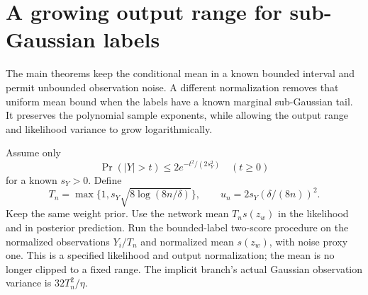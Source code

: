 \section{A growing output range for sub-Gaussian labels}
\label{sec:unbounded-mean-transfer}
The main theorems keep the conditional mean in a known bounded interval and permit unbounded observation noise. A different normalization removes that uniform mean bound when the labels have a known marginal sub-Gaussian tail. It preserves the polynomial sample exponents, while allowing the output range and likelihood variance to grow logarithmically.

Assume only
\[
 \Pr(|Y|>t)\le2e^{-t^2/(2s_Y^2)}\quad(t\ge0)
\]
for a known $s_Y>0$. Define
\[
 T_n=\max\{1,s_Y\sqrt{8\log(8n/\delta)}\},
 \qquad u_n=2s_Y(\delta/(8n))^2.
\]
Keep the same weight prior. Use the network mean $T_ns(z_w)$ in the likelihood and in posterior prediction. Run the bounded-label two-score procedure on the normalized observations $Y_i/T_n$ and normalized mean $s(z_w)$, with noise proxy one. This is a specified likelihood and output normalization; the mean is no longer clipped to a fixed range. The implicit branch's actual Gaussian observation variance is $32T_n^2/\eta$.


